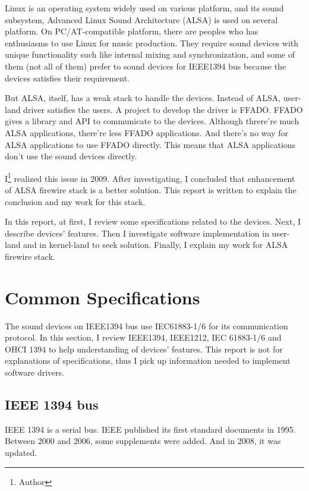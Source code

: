 \documentclass[onecolumn]{article}
\begin{document}
Linux is an operating system widely used on various platform, and its sound subsystem, Advanced Linux Sound Architecture (ALSA) is used on several platform. On PC/AT-compatible platform, there are peoples who has enthusiasms to use Linux for music production. They require sound devices with unique functionality such like internal mixing and synchronization, and some of them (not all of them) prefer to sound devices for IEEE1394 bus because the devices satisfies their requirement.

But ALSA, itself, has a weak stack to handle the devices. Instead of ALSA, user-land driver satisfies the users. A project to develop the driver is FFADO. FFADO gives a library and API to communicate to the devices. Although threre're much ALSA applications, there're less FFADO applications. And there's no way for ALSA applications to use FFADO directly. This means that ALSA applications don't use the sound devices directly.

I\footnote{Author} realized this issue in 2009. After investigating, I concluded that enhancement of ALSA firewire stack is a better solution. This report is written to explain the conclusion and my work for this stack.

In this report, at first, I review some specifications related to the devices. Next, I describe devices' features. Then I investigate software implementation in user-land and in kernel-land to seek solution. Finally, I explain my work for ALSA firewire stack.


\section{Common Specifications}

The sound devices on IEEE1394 bus use IEC61883-1/6 for its communication protocol. In this section, I review IEEE1394, IEEE1212, IEC 61883-1/6 and OHCI 1394 to help understanding of devices' features. This report is not for explanations of specifications, thus I pick up information needed to implement software drivers.

\subsection{IEEE 1394 bus}

IEEE 1394 is a serial bus. IEEE published its first standard documents in 1995\cite{ieee1394-1}. Between 2000 and 2006, some supplements were added\cite{ieee1394-1-a, ieee1394-1-b, ieee1394-1-c}. And in 2008, it was updated\cite{ieee1394-2}.
\end{document}
